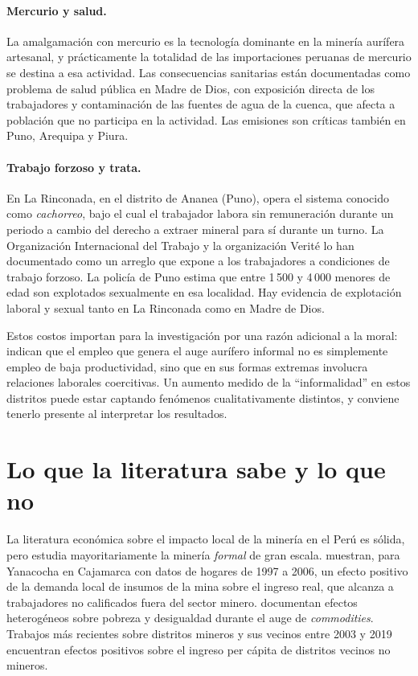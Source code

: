 \documentclass[11pt,a4paper]{article}
\begin{document}
\paragraph{Mercurio y salud.} La amalgamación con mercurio es la tecnología dominante en la minería aurífera artesanal, y prácticamente la totalidad de las importaciones peruanas de mercurio se destina a esa actividad. Las consecuencias sanitarias están documentadas como problema de salud pública en Madre de Dios, con exposición directa de los trabajadores y contaminación de las fuentes de agua de la cuenca, que afecta a población que no participa en la actividad. Las emisiones son críticas también en Puno, Arequipa y Piura.

\paragraph{Trabajo forzoso y trata.} En La Rinconada, en el distrito de Ananea (Puno), opera el sistema conocido como \emph{cachorreo}, bajo el cual el trabajador labora sin remuneración durante un periodo a cambio del derecho a extraer mineral para sí durante un turno. La Organización Internacional del Trabajo y la organización Verité lo han documentado como un arreglo que expone a los trabajadores a condiciones de trabajo forzoso. La policía de Puno estima que entre 1\,500 y 4\,000 menores de edad son explotados sexualmente en esa localidad. Hay evidencia de explotación laboral y sexual tanto en La Rinconada como en Madre de Dios.

Estos costos importan para la investigación por una razón adicional a la moral: indican que el empleo que genera el auge aurífero informal no es simplemente empleo de baja productividad, sino que en sus formas extremas involucra relaciones laborales coercitivas. Un aumento medido de la ``informalidad'' en estos distritos puede estar captando fenómenos cualitativamente distintos, y conviene tenerlo presente al interpretar los resultados.

\section{Lo que la literatura sabe y lo que no}

La literatura económica sobre el impacto local de la minería en el Perú es sólida, pero estudia mayoritariamente la minería \emph{formal} de gran escala. \citet{aragon2013} muestran, para Yanacocha en Cajamarca con datos de hogares de 1997 a 2006, un efecto positivo de la demanda local de insumos de la mina sobre el ingreso real, que alcanza a trabajadores no calificados fuera del sector minero. \citet{loayza2016} documentan efectos heterogéneos sobre pobreza y desigualdad durante el auge de \emph{commodities}. Trabajos más recientes sobre distritos mineros y sus vecinos entre 2003 y 2019 encuentran efectos positivos sobre el ingreso per cápita de distritos vecinos no mineros.
\end{document}
